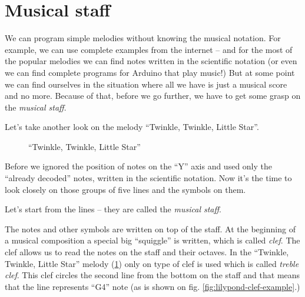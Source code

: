 \documentclass[../sparc.tex]{subfiles}
\begin{document}
\newpage
\section{Musical staff}

We can program simple melodies without knowing the musical notation.  For
example, we can use complete examples from the internet -- and for the most of
the popular melodies we can find notes written in the scientific notation (or
even we can find complete programs for Arduino that play music!)  But at some
point we can find ourselves in the situation where all we have is just a musical
score and no more.  Because of that, before we go further, we have to get some
grasp on the \emph{musical staff}.

Let's take another look on the melody ``Twinkle, Twinkle, Little Star''.

\begin{figure}[ht]
  \centering
  \label{fig:sound-fig-4}
  \caption{``Twinkle, Twinkle, Little Star''}
\end{figure}

Before we ignored the position of notes on the ``Y'' axis and used only the
``already decoded'' notes, written in the scientific notation.  Now it's the
time to look closely on those groups of five lines and the symbols on them.

Let's start from the lines -- they are called the \emph{musical staff}.

 The notes and other symbols are written on top of the
staff.  At the beginning of a musical composition a special big ``squiggle'' is
written, which is called \emph{clef}.  The clef allows us to read the notes on
the staff and their octaves.  In the ``Twinkle, Twinkle, Little Star'' melody
(\ref{fig:sound-fig-4}) only on type of clef is used which is called
\emph{treble clef}.  This clef circles the second line from the bottom on the
staff and that means that the line represents ``G4'' note (as is shown on fig.
\ref{fig:lilypond-clef-example}.)
\end{document}
